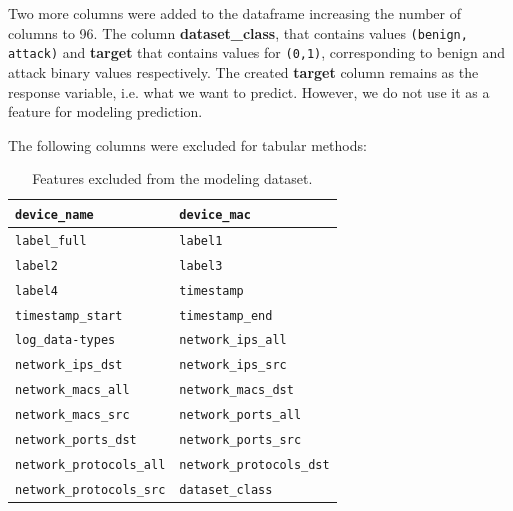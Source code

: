 \documentclass[final,5p,times,twocolumn]{elsarticle}
\begin{document}
\begin{table}[H]
\caption{Dataset sizes before and after combining benign and attack data.}
\centering
\small
\setlength{\tabcolsep}{3pt}
\renewcommand{\arraystretch}{1.15}
\label{tab:dataset_sizes}
\end{table}

Two more columns were added to the dataframe increasing the number of columns to 96. The column \textbf{dataset\_class}, that contains values \texttt{(benign, attack)} and \textbf{target} that contains values for \texttt{(0,1)}, corresponding to benign and attack binary values respectively. The created \textbf{target} column remains as the response variable, i.e. what we want to predict. However, we do not use it as a feature for modeling prediction.


The following columns were excluded for tabular methods:
\begin{table}[H]
\caption{Features excluded from the modeling dataset.}
\centering
\scriptsize
\renewcommand{\arraystretch}{1.20}
\begin{tabularx}{\columnwidth}{|X|X|}
\hline
\texttt{device\_name} & \texttt{device\_mac} \\ \hline
\texttt{label\_full} & \texttt{label1} \\ \hline
\texttt{label2} & \texttt{label3} \\ \hline
\texttt{label4} & \texttt{timestamp} \\ \hline
\texttt{timestamp\_start} & \texttt{timestamp\_end} \\ \hline
\texttt{log\_data-types} & \texttt{network\_ips\_all} \\ \hline
\texttt{network\_ips\_dst} & \texttt{network\_ips\_src} \\ \hline
\texttt{network\_macs\_all} & \texttt{network\_macs\_dst} \\ \hline
\texttt{network\_macs\_src} & \texttt{network\_ports\_all} \\ \hline
\texttt{network\_ports\_dst} & \texttt{network\_ports\_src} \\ \hline
\texttt{network\_protocols\_all} & \texttt{network\_protocols\_dst} \\ \hline
\texttt{network\_protocols\_src} & \texttt{dataset\_class} \\ \hline
\end{tabularx}
\label{tab:excluded_features}
\end{table}
\end{document}
